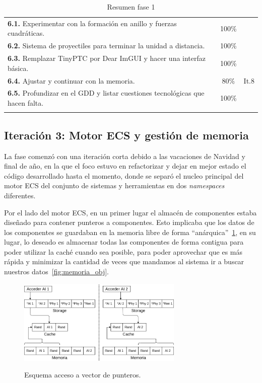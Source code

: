 \begin{longtable}[c]{|p{7cm}|c|c|}
	\cmidrule[1pt]{1-3}

\textbf{6.1.} Experimentar con la formación en anillo
				y fuerzas cuadráticas.                     & 100\% &   \\
	\cmidrule[.003pt]{1-3}
\textbf{6.2.} Sistema de proyectiles para terminar la
				unidad a distancia.                        & 100\% &   \\
	\cmidrule[.003pt]{1-3}
\textbf{6.3.} Remplazar  TinyPTC por Dear ImGUI y
				hacer una interfaz básica.                 & 100\% &   \\
	\cmidrule[.003pt]{1-3}
\textbf{6.4.} Ajustar y continuar con la memoria.          & 80\%  & It.8 \\
	\cmidrule[.003pt]{1-3}
\textbf{6.5.} Profundizar en el GDD y listar cuestiones
				tecnológicas que hacen falta.              & 100\% &   \\
\hline
\caption{Resumen fase 1}
\end{longtable}

\subsection*{Iteración 3: Motor ECS y gestión de memoria}
La fase comenzó con una iteración corta debido a las vacaciones de Navidad y final de año, en la
que el foco estuvo en refactorizar y dejar en mejor estado el código desarrollado
hasta el momento, donde se separó el nucleo principal del motor \ac{ECS} del conjunto de sistemas y
herramientas en dos \textit{namespaces} diferentes. 

Por el lado del motor \ac{ECS}, en un primer lugar el almacén de componentes estaba diseñado
para contener punteros a componentes. Esto implicaba que los datos de los componentes se
guardaban en la memoria libre de forma ``anárquica''~\ref{fig:memoria_ptr}, 
en su lugar, lo deseado es almacenar todas las componentes de forma contigua para poder utilizar
la caché cuando sea posible, para poder aprovechar que es más rápida y minimizar la cantidad de
veces que mandamos al sistema ir a buscar nuestros datos~\ref{fig:memoria_obj}.

\begin{figure}[htb]
\centering
\includegraphics[width=0.7\textwidth]{imagenes/diario_desarrollo/memoria2.png}\\
\caption{Esquema acceso a vector de punteros.}
\label{fig:memoria_ptr}
\end{figure}

